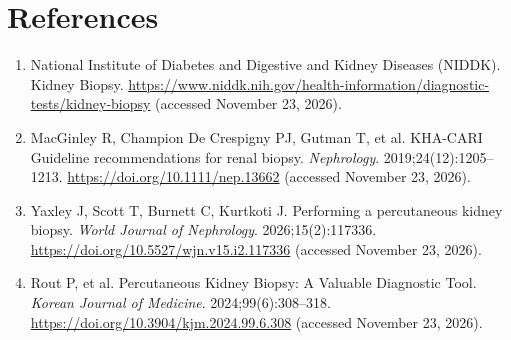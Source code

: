 \section*{References}
\begin{enumerate}
  \item National Institute of Diabetes and Digestive and Kidney Diseases (NIDDK). Kidney Biopsy. \url{https://www.niddk.nih.gov/health-information/diagnostic-tests/kidney-biopsy} (accessed November 23, 2026).
  \item MacGinley R, Champion De Crespigny PJ, Gutman T, et al. KHA-CARI Guideline recommendations for renal biopsy. \textit{Nephrology}. 2019;24(12):1205--1213. \url{https://doi.org/10.1111/nep.13662} (accessed November 23, 2026).
  \item Yaxley J, Scott T, Burnett C, Kurtkoti J. Performing a percutaneous kidney biopsy. \textit{World Journal of Nephrology}. 2026;15(2):117336. \url{https://doi.org/10.5527/wjn.v15.i2.117336} (accessed November 23, 2026).
  \item Rout P, et al. Percutaneous Kidney Biopsy: A Valuable Diagnostic Tool. \textit{Korean Journal of Medicine}. 2024;99(6):308--318. \url{https://doi.org/10.3904/kjm.2024.99.6.308} (accessed November 23, 2026).
\end{enumerate}

\clearpage
